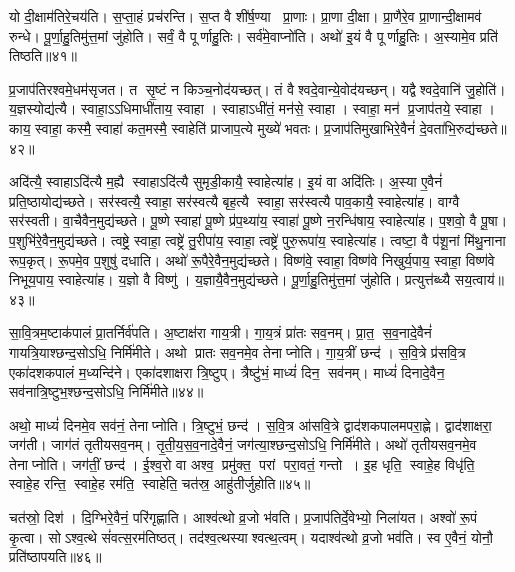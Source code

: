 यो दी॒क्षाम॑तिरे॒चय॑ति।
स॒प्ता॒हं प्रच॑रन्ति।
स॒प्त वै शी॑र्\mbox{}ष॒ण्या प्रा॒णाः।
प्रा॒णा दी॒क्षा।
प्रा॒णैरे॒व प्रा॒णान्दी॒क्षामव॑ रुन्धे।
पू॒र्णा॒हु॒तिमु॑त्त॒मां जु॑होति।
सर्वं॒ वै पूर्णाहु॒तिः।
सर्व॑मे॒वाप्नो॑ति।
अथो॑ इ॒यं वै पूर्णाहु॒तिः।
अ॒स्यामे॒व प्रति॑ तिष्ठति॥४१॥\anuvakamend[रु॒न्धे॒ प्रा॒णान्दी॒क्षामव॑ रुन्ध उच्यते क्रामन्ति तिष्ठति]

प्र॒जाप॑तिरश्वमे॒धम॑सृजत।
त सृ॒ष्टं न किञ्च॒नोद॑यच्छत्।
तं वैश्वदे॒वान्ये॒वोद॑यच्छन्।
यद्वैश्वदे॒वानि॑ जु॒होति॑।
य॒ज्ञस्योद्य॑त्यै।
स्वाहा॒ऽऽधिमाधी॑ताय॒ स्वाहा।
स्वाहाऽधी॑तं॒ मन॑से॒ स्वाहा।
स्वाहा॒ मन॑ प्र॒जाप॑तये॒ स्वाहा।
काय॒ स्वाहा॒ कस्मै॒ स्वाहा॑ कत॒मस्मै॒ स्वाहेति॑ प्राजाप॒त्ये मुख्ये॑ भवतः।
प्र॒जाप॑तिमुखाभिरे॒वैनं॑ दे॒वता॑भि॒रुद्य॑च्छते॥४२॥

अदि॑त्यै॒ स्वाहाऽदि॑त्यै म॒ह्यै स्वाहाऽदि॑त्यै सुमृडी॒कायै॒ स्वाहेत्या॑ह।
इ॒यं वा अदि॑तिः।
अ॒स्या ए॒वैनं॑ प्रति॒ष्ठायोद्य॑च्छते।
सर॑स्वत्यै॒ स्वाहा॒ सर॑स्वत्यै बृह॒त्यै स्वाहा॒ सर॑स्वत्यै पाव॒कायै॒ स्वाहेत्या॑ह।
वाग्वै सर॑स्वती।
वा॒चैवैन॒मुद्य॑च्छते।
पू॒ष्णे स्वाहा॑ पू॒ष्णे प्र॑प॒थ्या॑य॒ स्वाहा॑ पू॒ष्णे न॒रन्धि॑षाय॒ स्वाहेत्या॑ह।
प॒शवो॒ वै पू॒षा।
प॒शुभि॑रे॒वैन॒मुद्य॑च्छते।
त्वष्ट्रे॒ स्वाहा॒ त्वष्ट्रे॑ तु॒रीपा॑य॒ स्वाहा॒ त्वष्ट्रे॑ पुरु॒रूपा॑य॒ स्वाहेत्या॑ह।
त्वष्टा॒ वै प॑शू॒नां मि॑थु॒नाना रूप॒कृत्।
रू॒पमे॒व प॒शुषु॑ दधाति।
अथो॑ रू॒पैरे॒वैन॒मुद्य॑च्छते।
विष्ण॑वे॒ स्वाहा॒ विष्ण॑वे निखुर्य॒पाय॒ स्वाहा॒ विष्ण॑वे निभूय॒पाय॒ स्वाहेत्या॑ह।
य॒ज्ञो वै विष्णु॑।
य॒ज्ञायै॒वैन॒मुद्य॑च्छते।
पू॒र्णा॒हु॒तिमु॑त्त॒मां जु॑होति।
प्रत्युत्त॑ब्ध्यै सय॒त्वाय॑॥४३॥\anuvakamend[य॒च्छ॒ते॒ पु॒रु॒रूपा॑य॒ स्वाहेत्या॑हा॒ष्टौ च॑]

सा॒वि॒त्रम॒ष्टाक॑पालं प्रा॒तर्निर्व॑पति।
अ॒ष्टाक्ष॑रा गाय॒त्री।
गा॒य॒त्रं प्रा॑तः सव॒नम्।
प्रा॒त॒ स॒व॒नादे॒वैनं॑ गायत्रि॒याश्छन्द॒सोऽधि॒ निर्मि॑मीते।
अथो प्रातः सव॒नमे॒व तेनाप्नोति।
गा॒य॒त्रीं छन्द॑।
स॒वि॒त्रे प्र॑सवि॒त्र एका॑दशकपालं म॒ध्यन्दि॑ने।
एका॑दशाक्षरा त्रि॒ष्टुप्।
त्रैष्टु॑भं॒ माध्यं॑ दिन॒ सव॑नम्।
माध्यं॑ दिनादे॒वैन॒ सव॑नात्रि॒ष्टुभ॒श्छन्द॒सोऽधि॒ निर्मि॑मीते॥४४॥

अथो॒ माध्यं॑ दिनमे॒व सव॑नं॒ तेनाप्नोति।
त्रि॒ष्टुभं॒ छन्द॑।
स॒वि॒त्र आ॑सवि॒त्रे द्वाद॑शकपालमपरा॒ह्णे।
द्वाद॑शाक्षरा॒ जग॑ती।
जाग॑तं तृतीयसव॒नम्।
तृ॒ती॒य॒स॒व॒नादे॒वैनं॒ जग॑त्या॒श्छन्द॒सोऽधि॒ निर्मि॑मीते।
अथो॑ तृतीयसव॒नमे॒व तेनाप्नोति।
जग॑तीं॒ छन्द॑।
ई॒श्व॒रो वा अश्व॒ प्रमु॑क्त॒ परां परा॒वतं॒ गन्तो।
इ॒ह धृति॒ स्वाहे॒ह विधृ॑ति॒ स्वाहे॒ह रन्ति॒ स्वाहे॒ह रम॑ति॒ स्वाहेति॒ चत॑स्र॒ आहु॑तीर्जुहोति॥४५॥

चत॑स्रो॒ दिश॑।
दि॒ग्भिरे॒वैनं॒ परि॑गृह्णाति।
आश्व॑त्थो व्र॒जो भ॑वति।
प्र॒जाप॑तिर्दे॒वेभ्यो॒ निला॑यत।
अश्वो॑ रू॒पं कृ॒त्वा।
सोऽश्व॒त्थे सं॑वत्स॒रम॑तिष्ठत्।
तद॑श्व॒त्थस्याश्वत्थ॒त्वम्।
यदाश्व॑त्थो व्र॒जो भव॑ति।
स्व ए॒वैनं॒ योनौ॒ प्रति॑ष्ठापयति॥४६॥\anuvakamend[त्रि॒ष्टुभ॒श्छन्द॒सोऽधि॒ निर्मि॑मीते जुहोति॒ नव॑ च]

